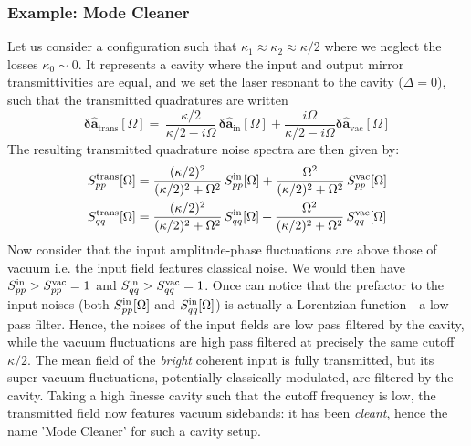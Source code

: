 \subsubsection{Example: Mode Cleaner }
Let us consider a configuration such that $\kappa_1 \approx \kappa_2 \approx \kappa/2$ where we neglect the losses $\kappa_0\sim 0$. It represents a cavity where the input and output mirror transmittivities are equal, and we set the laser resonant to the cavity ($\Delta=0$), such that the transmitted quadratures are written
\begin{equation}
  \mathbf{\delta \hat{a}_{\mathrm{trans}}}[\Omega]  = \, \dfrac{ \kappa/2}{\kappa/2-i\Omega}  \, \mathbf{\delta \hat{a}_{\mathrm{in}}}[\Omega]   +  \dfrac{i\Omega}{\kappa/2-i\Omega}   \mathbf{\delta \hat{a}_{\mathrm{vac}}}[\Omega]  
\end{equation}
The resulting transmitted quadrature noise spectra are then given by: 
\begin{equation}
  \begin{split}
    S_{pp}^{\rm trans}[\Omega] &=\frac{(\kappa/2)^2}{(\kappa/2)^2+\Omega^2}\,S_{pp}^{\rm in}[\Omega]+\frac{\Omega^2}{(\kappa/2)^2+\Omega^2}\,S_{pp}^{\rm vac}[\Omega] \\
    S_{qq}^{\rm trans}[\Omega]&=\frac{(\kappa/2)^2}{(\kappa/2)^2+\Omega^2}\,S_{qq}^{\rm in}[\Omega]+\frac{\Omega^2}{(\kappa/2)^2+\Omega^2}\,S_{qq}^{\rm vac}[\Omega]
  \end{split}
\end{equation}
Now consider that the input amplitude-phase fluctuations are above those of vacuum i.e. the input field features classical noise. We would then have $S_{pp}^{\rm in}> S_{pp}^{\rm vac}=1$ and $S_{qq}^{\rm in}> S_{qq}^{\rm vac}=1$. Once can notice that the prefactor to the input noises (both $S_{pp}^{\rm in}[\Omega]$ and $S_{qq}^{\rm in}[\Omega]$) is actually a Lorentzian function - a low pass filter. Hence, the noises of the input fields are low pass filtered by the cavity, while the vacuum fluctuations are high pass filtered at precisely the same cutoff $\kappa/2$. The mean field of the \textit{bright} coherent input is fully transmitted, but its super-vacuum fluctuations, potentially classically modulated, are filtered by the cavity. Taking a high finesse cavity such that the cutoff frequency is low, the transmitted field now features vacuum sidebands: it has been \textit{cleant}, hence the name 'Mode Cleaner' for such a cavity setup.  

